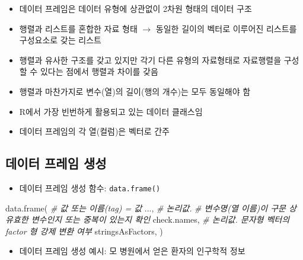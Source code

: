 \documentclass[
  11pt,
]{krantz}
\newenvironment{Shaded}{\begin{snugshade}}{\end{snugshade}}
\newcommand{\CommentTok}[1]{\textcolor[rgb]{0.37,0.37,0.37}{\textit{#1}}}
\newcommand{\FunctionTok}[1]{\textcolor[rgb]{0,0,0}{#1}}
\newcommand{\NormalTok}[1]{#1}
\providecommand{\tightlist}{%
  \setlength{\itemsep}{0pt}\setlength{\parskip}{0pt}}
\begin{document}
\normalsize

\begin{itemize}
\tightlist
\item
  데이터 프레임은 데이터 유형에 상관없이 2차원 형태의 데이터 구조
\item
  행렬과 리스트를 혼합한 자료 형태 \(\rightarrow\) 동일한 길이의 벡터로 이루어진 리스트를 구성요소로 갖는 리스트
\item
  행렬과 유사한 구조를 갖고 있지만 각기 다른 유형의 자료형태로 자료행렬을 구성할 수 있다는 점에서 행렬과 차이를 갖음
\item
  행렬과 마찬가지로 변수(열)의 길이(행의 개수)는 모두 동일해야 함
\item
  R에서 가장 빈번하게 활용되고 있는 데이터 클래스임
\item
  데이터 프레임의 각 열(컬럼)은 벡터로 간주
\end{itemize}

\hypertarget{create-data-frame}{%
\subsection{데이터 프레임 생성}\label{create-data-frame}}

\begin{itemize}
\tightlist
\item
  데이터 프레임 생성 함수: \texttt{data.frame()}
\end{itemize}

\footnotesize

\begin{Shaded}
\begin{Highlighting}[]
\FunctionTok{data.frame}\NormalTok{(}
  \CommentTok{\# 값 또는 이름(tag) = 값}
\NormalTok{  ..., }
  \CommentTok{\# 논리값. }
  \CommentTok{\# 변수명(열 이름)이 구문 상 유효한 변수인지 또는 중복이 있는지 확인}
\NormalTok{  check.names, }
  \CommentTok{\# 논리값. 문자형 벡터의 factor 형 강제 변환 여부 }
\NormalTok{  stringsAsFactors, }
\NormalTok{)}
\end{Highlighting}
\end{Shaded}

\normalsize

\begin{itemize}
\tightlist
\item
  데이터 프레임 생성 예시: 모 병원에서 얻은 환자의 인구학적 정보
\end{itemize}

\footnotesize
\end{document}
